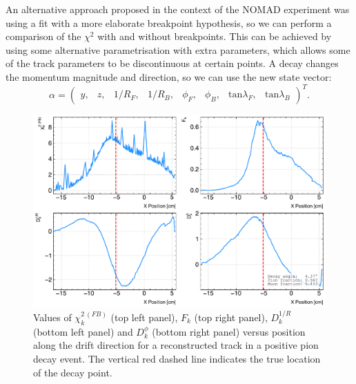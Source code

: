 An alternative approach proposed in the context of the NOMAD experiment was using a fit with a more elaborate breakpoint hypothesis, so we can perform a comparison of the $\chi^{2}$ with and without breakpoints. This can be achieved by using some alternative parametrisation with extra parameters, which allows some of the track parameters to be discontinuous at certain points. A decay changes the momentum magnitude and direction, so we can use the new state vector:
\begin{equation}
	\alpha=\begin{pmatrix}y,& z,& 1/R_{F},& 1/R_{B},& \phi_{F},& \phi_{B},& \mathrm{tan}\lambda_{F},& \mathrm{tan}\lambda_{B}\end{pmatrix}^{T}.
\end{equation}

\begin{figure}[t]
	\centering
	\includegraphics[width=.85\linewidth]{Images/GArSoft_PID/pion_decay/pion_decay_variables_event_425.pdf}
	\caption{Values of $\chi^{2 \ (FB)}_{k}$ (top left panel), $F_{k}$ (top right panel), $D^{1/R}_{k}$ (bottom left panel) and $D^{\phi}_{k}$ (bottom right panel) versus position along the drift direction for a reconstructed track in a positive pion decay event. The vertical red dashed line indicates the true location of the decay point.}
	\label{fig:breakpoint_variables_example}
\end{figure}

